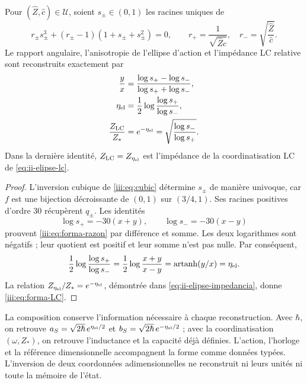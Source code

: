\begin{proposition}
\label{iii:prop:forma-LC}
Pour $(\widehat Z,\widehat c)\in\mathcal U$, soient $s_\pm\in(0,1)$ les
racines uniques de
\begin{equation}
 r_\pm s_\pm^3+(r_\pm-1)(1+s_\pm+s_\pm^2)=0,
 \qquad
 r_+=\frac1{\sqrt{\widehat Z\widehat c}},\quad
 r_-=\sqrt{\frac{\widehat Z}{\widehat c}}.
 \label{iii:eq:forma-inversion}
\end{equation}
Le rapport angulaire, l’anisotropie de l’ellipse d’action et l’impédance
LC relative sont reconstruits exactement par
\begin{align}
 \frac{y}{x}
 &=\frac{\log s_+-\log s_-}{\log s_++\log s_-},
 \label{iii:eq:forma-razon}\\
 \eta_{\rm el}
 &=\frac12\log\frac{\log s_+}{\log s_-},
 \label{iii:eq:forma-eta}\\
 \frac{Z_{\rm LC}}{Z_*}
 &=e^{-\eta_{\rm el}}
  =\sqrt{\frac{\log s_-}{\log s_+}}.
 \label{iii:eq:forma-LC}
\end{align}
Dans la dernière identité, $Z_{\rm LC}=Z_{\eta_{\rm el}}$ est l’impédance
de la coordinatisation LC de \eqref{eq:ii-elipse-lc}.
\end{proposition}
\begin{proof}
L'inversion cubique de \eqref{iii:eq:cubic} détermine $s_\pm$ de manière univoque, car $f$ est une bijection décroissante de $(0,1)$ sur $(3/4,1)$. Ses racines positives d'ordre $30$ récupèrent $q_\pm$. Les identités
\[
 \log s_+=-30(x+y),\qquad \log s_-=-30(x-y)
\]
prouvent \eqref{iii:eq:forma-razon} par différence et somme. Les deux logarithmes
sont négatifs ; leur quotient est positif et leur somme n’est pas nulle. Par conséquent,
\[
 \frac12\log\frac{\log s_+}{\log s_-}
   =\frac12\log\frac{x+y}{x-y}
   =\operatorname{artanh}(y/x)=\eta_{\rm el}.
\]
La relation $Z_{\eta_{\rm el}}/Z_*=e^{-\eta_{\rm el}}$, démontrée dans
\eqref{eq:ii-elipse-impedancia}, donne \eqref{iii:eq:forma-LC}.
\end{proof}

La composition conserve l’information nécessaire à chaque reconstruction.
Avec $\hbar$, on retrouve
$a_S=\sqrt{2\hbar}\,e^{\eta_{\rm el}/2}$ et
$b_S=\sqrt{2\hbar}\,e^{-\eta_{\rm el}/2}$ ; avec la coordinatisation
$(\omega,Z_*)$, on retrouve l’inductance et la capacité déjà définies.
L’action, l’horloge et la référence dimensionnelle accompagnent la forme comme
données typées. L’inversion de deux coordonnées adimensionnelles ne
reconstruit ni leurs unités ni toute la mémoire de l’état.

